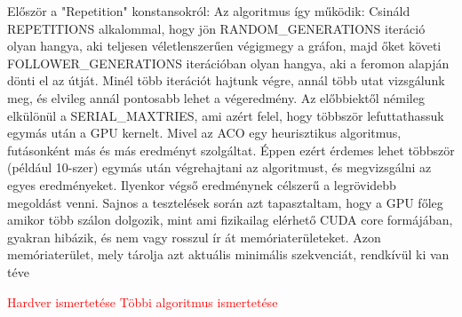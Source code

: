 Először a "Repetition" konstansokról: Az algoritmus így működik: Csináld REPETITIONS alkalommal, hogy jön RANDOM\_GENERATIONS iteráció olyan hangya, aki teljesen véletlenszerűen végigmegy a gráfon, majd őket követi FOLLOWER\_GENERATIONS iterációban olyan hangya, aki a feromon alapján dönti el az útját. Minél több iterációt hajtunk végre, annál több utat vizsgálunk meg, és elvileg annál pontosabb lehet a végeredmény.
Az előbbiektől némileg elkülönül a SERIAL\_MAXTRIES, ami azért felel, hogy többször lefuttathassuk egymás után a GPU kernelt. Mivel az ACO egy heurisztikus algoritmus, futásonként más és más eredményt szolgáltat. Éppen ezért érdemes lehet többször (például 10-szer) egymás után végrehajtani az algoritmust, és megvizsgálni az egyes eredményeket. Ilyenkor végső eredménynek célszerű a legrövidebb megoldást venni. Sajnos a tesztelések során azt tapasztaltam, hogy a GPU főleg amikor több szálon dolgozik, mint ami fizikailag elérhető CUDA core formájában, gyakran hibázik, és nem vagy rosszul ír át memóriaterületeket. Azon memóriaterület, mely tárolja azt aktuális minimális szekvenciát, rendkívül ki van téve 

\textcolor{red}{Hardver ismertetése}
\textcolor{red}{Többi algoritmus ismertetése}




